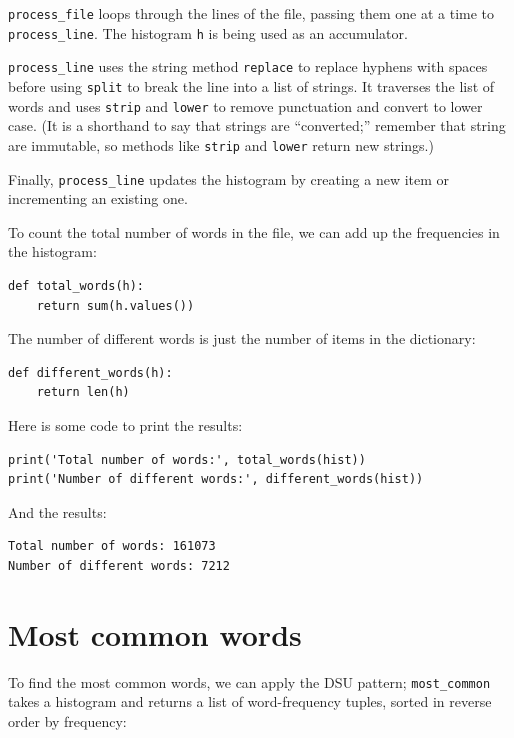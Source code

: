 \documentclass[10pt]{book}
\begin{document}

\verb"process_file" loops through the lines of the file,
passing them one at a time to \verb"process_line".  The histogram
{\tt h} is being used as an accumulator.


\verb"process_line" uses the string method {\tt replace} to replace
hyphens with spaces before using {\tt split} to break the line into a
list of strings.  It traverses the list of words and uses {\tt strip}
and {\tt lower} to remove punctuation and convert to lower case.  (It
is a shorthand to say that strings are ``converted;'' remember that
string are immutable, so methods like {\tt strip} and {\tt lower}
return new strings.)

Finally, \verb"process_line" updates the histogram by creating a new
item or incrementing an existing one.


To count the total number of words in the file, we can add up
the frequencies in the histogram:

\beforeverb
\begin{verbatim}
def total_words(h):
    return sum(h.values())
\end{verbatim}
\afterverb
%
The number of different words is just the number of items in
the dictionary:

\beforeverb
\begin{verbatim}
def different_words(h):
    return len(h)
\end{verbatim}
\afterverb
%
Here is some code to print the results:

\beforeverb
\begin{verbatim}
print('Total number of words:', total_words(hist))
print('Number of different words:', different_words(hist))
\end{verbatim}
\afterverb
%
And the results:

\beforeverb
\begin{verbatim}
Total number of words: 161073
Number of different words: 7212
\end{verbatim}
\afterverb
%

\section{Most common words}


To find the most common words, we can apply the DSU pattern;
\verb"most_common" takes a histogram and returns a list of
word-frequency tuples, sorted in reverse order by frequency:
\end{document}

